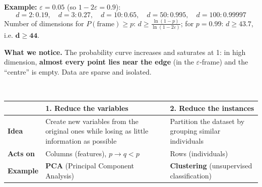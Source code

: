 \documentclass[10pt,a4paper]{article}
\begin{document}
\vspace{10pt}
\noindent\textcolor{accentred}{\textbf{Example:}} $\varepsilon = 0.05$ (so $1 - 2\varepsilon = 0.9$):
\[
d = 2: 0.19, \quad d = 3: 0.27, \quad d = 10: 0.65, \quad d = 50: 0.995, \quad d = 100: 0.99997
\]
Number of dimensions for $P(\text{frame}) \ge p$: $d \ge \frac{\ln(1 - p)}{\ln(1 - 2\varepsilon)}$; for $p = 0.99$: $d \ge 43.7$, i.e. $\mathbf{d \ge 44}$.

\vspace{10pt}
\begin{tcolorbox}[
    colframe=accentred,
    colback=white,
    arc=1.5mm,
    boxrule=0.5pt,
    left=8pt, right=8pt, top=6pt, bottom=6pt
]
\textbf{What we notice.} The probability curve increases and saturates at 1: in high dimension, \textbf{almost every point lies near the edge} (in the $\varepsilon$-frame) and the ``centre'' is empty. Data are sparse and isolated.
\end{tcolorbox}

\vspace{16pt}

\\[8pt]
\begin{center}
\small
\begin{tabular}{p{}p{}p{}}
\toprule
\rowcolor{lightbg}
 & \textbf{1. Reduce the variables} & \textbf{2. Reduce the instances} \\
\midrule
\textbf{Idea} & Create new variables from the original ones while losing as little information as possible & Partition the dataset by grouping similar individuals \\
\addlinespace[6pt]
\textbf{Acts on} & Columns (features), $p \to q < p$ & Rows (individuals) \\
\addlinespace[6pt]
\textbf{Example} & \textbf{PCA} (Principal Component Analysis) & \textbf{Clustering} (unsupervised classification) \\
\bottomrule
\end{tabular}
\end{center}
\end{document}
